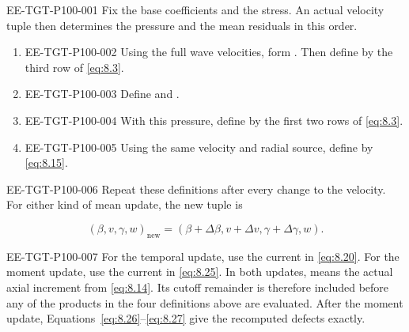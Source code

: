 %
\begin{EESegment}{EE-TGT-P100-001}
Fix the base coefficients and the stress. An actual velocity tuple
 then determines the pressure and the mean residuals in
this order.
\end{EESegment}
\begin{enumerate}[label=(\arabic*)]
\item \begin{EESegment}{EE-TGT-P100-002}
Using the full wave velocities, form
. Then define
 by the third row of \eqref{eq:8.3}.
\end{EESegment}
\item \begin{EESegment}{EE-TGT-P100-003}
Define  and
.
\end{EESegment}
\item \begin{EESegment}{EE-TGT-P100-004}
With this pressure, define  by the first two rows of
\eqref{eq:8.3}.
\end{EESegment}
\item \begin{EESegment}{EE-TGT-P100-005}
Using the same velocity and radial source, define
 by \eqref{eq:8.15}.
\end{EESegment}
\end{enumerate}
\begin{EESegment}{EE-TGT-P100-006}
Repeat these definitions after every change to the velocity. For either kind of mean update, the new
tuple is
\end{EESegment}
\[
(\beta,v,\gamma,w)_{\mathrm{new}}
=(\beta+\Delta\beta,v+\Delta v,\gamma+\Delta\gamma,w).
\]
\begin{EESegment}{EE-TGT-P100-007}
For the temporal update, use the current  in
\eqref{eq:8.20}. For the moment update, use the current
 in \eqref{eq:8.25}. In both
updates,  means the actual axial increment from
\eqref{eq:8.14}. Its cutoff remainder is therefore included before any of the products in the four
definitions above are evaluated. After the moment update, Equations~\eqref{eq:8.26}--\eqref{eq:8.27}
give the recomputed defects exactly.
\end{EESegment}

